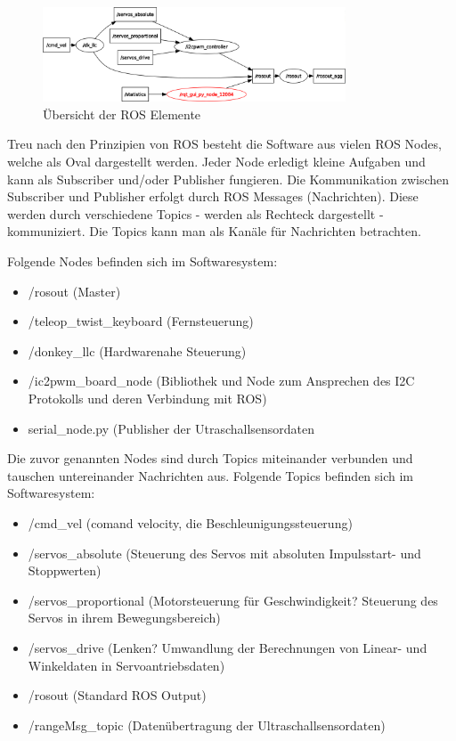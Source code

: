 \documentclass[conference]{IEEEtran}
\begin{document}
	\begin{figure}[!ht] 
    \centering
    \includegraphics[width=9cm]{img/rosgraph.png}
    \caption{Übersicht der ROS Elemente}
    \label{rosgraph}
    \end{figure}
    
    Treu nach den Prinzipien von ROS besteht die Software aus vielen ROS Nodes, welche als Oval dargestellt werden. 
    Jeder Node erledigt kleine Aufgaben und kann als Subscriber und/oder Publisher fungieren. Die Kommunikation zwischen Subscriber und Publisher erfolgt durch ROS Messages (Nachrichten). Diese werden durch verschiedene Topics - werden als Rechteck dargestellt - kommuniziert. Die Topics kann man als Kanäle für Nachrichten betrachten.
    
    Folgende Nodes befinden sich im Softwaresystem:
    \begin{itemize}
        \item /rosout (Master)
        \item /teleop\_twist\_keyboard (Fernsteuerung)
        \item /donkey\_llc (Hardwarenahe Steuerung)
        \item /ic2pwm\_board\_node (Bibliothek und Node zum Ansprechen des I2C Protokolls und deren Verbindung mit ROS)
        \item serial\_node.py (Publisher der Utraschallsensordaten
    \end{itemize}
    
    Die zuvor genannten Nodes sind durch Topics miteinander verbunden und tauschen untereinander Nachrichten aus. Folgende Topics befinden sich im Softwaresystem:
    \begin{itemize}
        \item /cmd\_vel (comand velocity, die Beschleunigungssteuerung)
        \item /servos\_absolute (Steuerung des Servos mit absoluten Impulsstart- und Stoppwerten)
        \item /servos\_proportional (Motorsteuerung für Geschwindigkeit? Steuerung des Servos in ihrem Bewegungsbereich)
        \item /servos\_drive (Lenken? Umwandlung der Berechnungen von Linear- und Winkeldaten in Servoantriebsdaten)
        \item /rosout (Standard ROS Output)
        \item /rangeMsg\_topic (Datenübertragung der Ultraschallsensordaten)
    \end{itemize}
    
\end{document}
